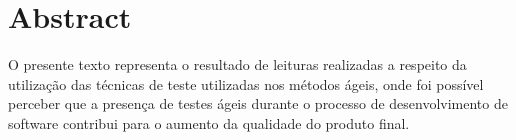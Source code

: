 \chapter*{Abstract}

O presente texto representa o resultado de leituras realizadas a respeito da utilização das técnicas de teste utilizadas nos métodos ágeis, onde foi possível perceber que a presença de testes ágeis durante o processo de desenvolvimento de software contribui para o aumento da qualidade do produto final. 
